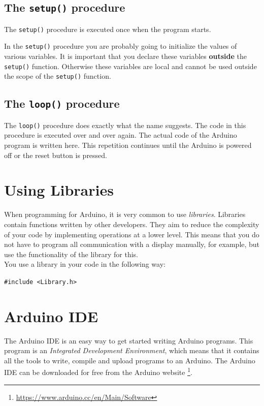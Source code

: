 \documentclass[11pt,fleqn]{book} %
\begin{document}
\subsection{The \texttt{setup()} procedure}
The \texttt{setup()} procedure is executed once when the program starts.

\begin{remark}
    In the \texttt{setup()} procedure you are probably going to initialize the values of various variables. It is important that you declare these variables \textbf{outside} the \texttt{setup()} function. Otherwise these variables are local and cannot be used outside the scope of the \texttt{setup()} function.
\end{remark}

\subsection{The \texttt{loop()} procedure}
The \texttt{loop()} procedure does exactly what the name suggests. The code in this procedure is executed over and over again. The actual code of the Arduino program is written here. This repetition continues until the Arduino is powered off or the reset button is pressed.

\section{Using Libraries}
When programming for Arduino, it is very common to use \emph{libraries}. Libraries contain functions written by other developers. They aim to reduce the complexity of your code by implementing operations at a lower level. This means that you do not have to program all communication with a display manually, for example, but use the functionality of the library for this.\\

\noindent
You use a library in your code in the following way:
\begin{center}
	\texttt{#include <Library.h>}
\end{center}

\section{Arduino IDE}
The Arduino IDE is an easy way to get started writing Arduino programs. This program is an \emph {Integrated Development Environment}, which means that it contains all the tools to write, compile and upload programs to an Arduino. The Arduino IDE can be downloaded for free from the Arduino website \footnote{\url{https://www.arduino.cc/en/Main/Software}}.
\end{document}
